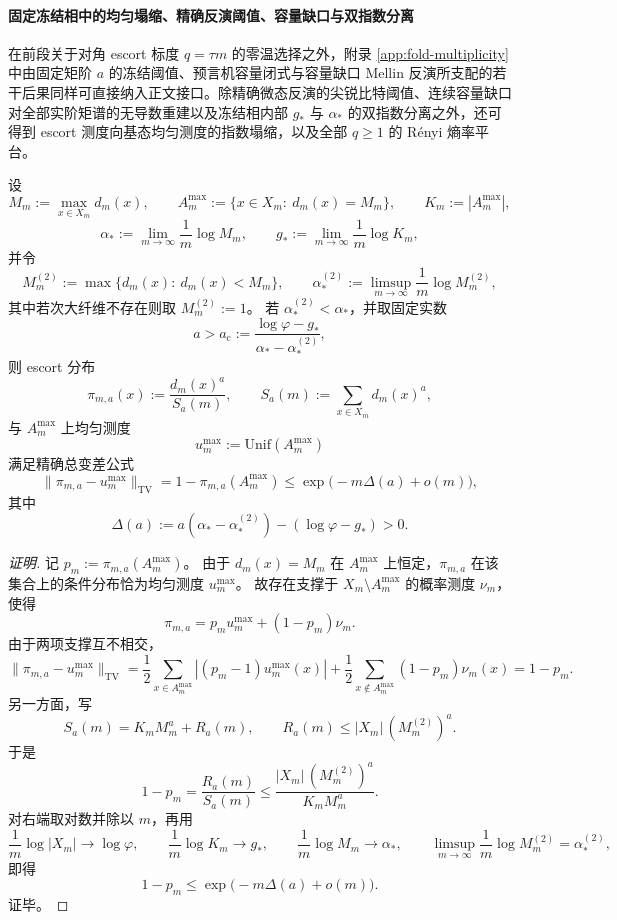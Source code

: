\paragraph{固定冻结相中的均匀塌缩、精确反演阈值、容量缺口与双指数分离}
在前段关于对角 escort 标度 \(q=\tau m\) 的零温选择之外，附录 \ref{app:fold-multiplicity} 中由固定矩阶 \(a\) 的冻结阈值、预言机容量闭式与容量缺口 Mellin 反演所支配的若干后果同样可直接纳入正文接口。除精确微态反演的尖锐比特阈值、连续容量缺口对全部实阶矩谱的无导数重建以及冻结相内部 \(g_*\) 与 \(\alpha_*\) 的双指数分离之外，还可得到 escort 测度向基态均匀测度的指数塌缩，以及全部 \(q\ge 1\) 的 Rényi 熵率平台。

\begin{theorem}\label{thm:xi-terminal-fixed-freezing-tv-collapse}
设
\[
M_m:=\max_{x\in X_m}d_m(x),\qquad
A_m^{\max}:=\{x\in X_m:\ d_m(x)=M_m\},\qquad
K_m:=|A_m^{\max}|,
\]
\[
\alpha_*:=\lim_{m\to\infty}\frac{1}{m}\log M_m,\qquad
g_*:=\lim_{m\to\infty}\frac{1}{m}\log K_m,
\]
并令
\[
M_m^{(2)}:=\max\{d_m(x):\ d_m(x)<M_m\},\qquad
\alpha_*^{(2)}:=\limsup_{m\to\infty}\frac{1}{m}\log M_m^{(2)},
\]
其中若次大纤维不存在则取 \(M_m^{(2)}:=1\)。
若 \(\alpha_*^{(2)}<\alpha_*\)，并取固定实数
\[
a>a_{\mathrm c}:=\frac{\log\varphi-g_*}{\alpha_*-\alpha_*^{(2)}},
\]
则 escort 分布
\[
\pi_{m,a}(x):=\frac{d_m(x)^a}{S_a(m)},\qquad
S_a(m):=\sum_{x\in X_m}d_m(x)^a,
\]
与 \(A_m^{\max}\) 上均匀测度
\[
u_m^{\max}:=\mathrm{Unif}(A_m^{\max})
\]
满足精确总变差公式
\[
\boxed{\;
\|\pi_{m,a}-u_m^{\max}\|_{\mathrm{TV}}
=
1-\pi_{m,a}(A_m^{\max})
\le
\exp\!\bigl(-m\Delta(a)+o(m)\bigr),\;}
\]
其中
\[
\Delta(a):=a(\alpha_*-\alpha_*^{(2)})-(\log\varphi-g_*)>0.
\]
\end{theorem}
\begin{proof}[证明]
记 \(p_m:=\pi_{m,a}(A_m^{\max})\)。
由于 \(d_m(x)=M_m\) 在 \(A_m^{\max}\) 上恒定，\(\pi_{m,a}\) 在该集合上的条件分布恰为均匀测度 \(u_m^{\max}\)。
故存在支撑于 \(X_m\setminus A_m^{\max}\) 的概率测度 \(\nu_m\)，使得
\[
\pi_{m,a}=p_m u_m^{\max}+(1-p_m)\nu_m.
\]
由于两项支撑互不相交，
\[
\|\pi_{m,a}-u_m^{\max}\|_{\mathrm{TV}}
=
\frac12\sum_{x\in A_m^{\max}}|(p_m-1)u_m^{\max}(x)|
+\frac12\sum_{x\notin A_m^{\max}}(1-p_m)\nu_m(x)
=
1-p_m.
\]
另一方面，写
\[
S_a(m)=K_mM_m^a+R_a(m),
\qquad
R_a(m)\le |X_m|\,(M_m^{(2)})^a.
\]
于是
\[
1-p_m=\frac{R_a(m)}{S_a(m)}
\le
\frac{|X_m|\,(M_m^{(2)})^a}{K_mM_m^a}.
\]
对右端取对数并除以 \(m\)，再用
\[
\frac1m\log|X_m|\to\log\varphi,\qquad
\frac1m\log K_m\to g_*,\qquad
\frac1m\log M_m\to \alpha_*,\qquad
\limsup_{m\to\infty}\frac1m\log M_m^{(2)}=\alpha_*^{(2)},
\]
即得
\[
1-p_m\le \exp\!\bigl(-m\Delta(a)+o(m)\bigr).
\]
证毕。
\end{proof}


